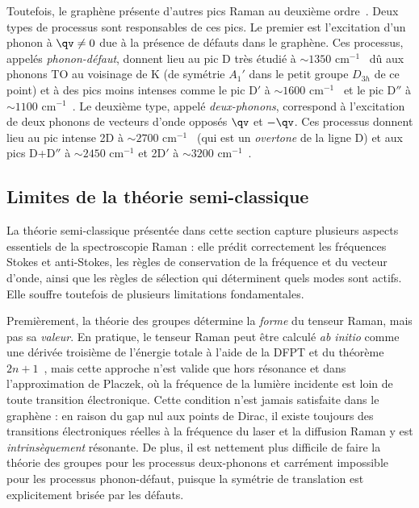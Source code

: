 Toutefois, le graphène présente d'autres pics Raman au deuxième ordre~\cite{mohiuddinUniaxialStrainGraphene2009,dresselhausRamanSpectroscopyIsolated2002}. Deux types de processus sont responsables de ces pics. Le premier est l'excitation d'un phonon à $\qv\neq 0$ due à la présence de défauts dans le graphène. Ces processus, appelés \textit{phonon-défaut}, donnent lieu au pic D très étudié à $\sim 1350$ cm$^{-1}$~\cite{tuinstraRamanSpectrumGraphite1970,ferrariInterpretationRamanSpectra2000,ferrariResonantRamanSpectroscopy2001} dû aux phonons TO au voisinage de K (de symétrie $A_1'$ dans le petit groupe $D_{3h}$ de ce point) et à des pics moins intenses comme le pic D$'$ à $\sim 1600$ cm$^{-1}$~\cite{nemanichFirstSecondorderRaman1979} et le pic D$''$ à $\sim 1100$ cm$^{-1}$~\cite{luccheseQuantifyingIoninducedDefects2010,martinsferreiraEvolutionRamanSpectra2010}. Le deuxième type, appelé \textit{deux-phonons}, correspond à l'excitation de deux phonons de vecteurs d'onde opposés $\qv$
et $-\qv$. Ces processus donnent lieu au pic intense 2D à $\sim 2700$ cm$^{-1}$~\cite{ferrariRamanSpectrumGraphene2006} (qui est un \textit{overtone} de la ligne D) et aux pics D+D$''$ à $\sim 2450$ cm$^{-1}$ et 2D$'$ à $\sim 3200$ cm$^{-1}$~\cite{berciaudProbingIntrinsicProperties2009}.

\subsection{Limites de la théorie semi-classique}

La théorie semi-classique présentée dans cette section capture plusieurs aspects essentiels de la spectroscopie Raman : elle prédit correctement les fréquences Stokes et anti-Stokes, les règles de conservation de la fréquence et du vecteur d'onde, ainsi que les règles de sélection qui déterminent quels modes sont actifs. Elle souffre toutefois de plusieurs limitations fondamentales. 

Premièrement, la théorie des groupes détermine la \textit{forme} du tenseur Raman, mais pas sa \textit{valeur}. En pratique, le tenseur Raman peut être calculé \textit{ab initio} comme une dérivée troisième de l'énergie totale à l'aide de la DFPT et du théorème $2n+1$~\cite{lazzeriFirstPrinciplesCalculationVibrational2003}, mais cette approche n'est valide que hors résonance et dans l'approximation de Placzek, où la fréquence de la lumière incidente est loin de toute transition électronique. Cette condition n'est jamais satisfaite dans le graphène : en raison du gap nul aux points de Dirac, il existe toujours des transitions électroniques réelles à la fréquence du laser et la diffusion Raman y est \textit{intrinsèquement} résonante. De plus, il est nettement plus difficile de faire la théorie des groupes pour les processus deux-phonons et carrément impossible pour les processus phonon-défaut, puisque la symétrie de translation est explicitement brisée par les défauts. 

